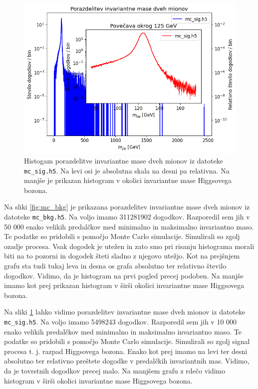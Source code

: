 \documentclass[slovene,11pt,a4paper]{article}
\begin{document}
\begin{figure}[h!]
    \centering
    \includegraphics[width=0.8\linewidth]{imgs/mc_sig.png}
    \caption{Histogam porazdelitve invariantne mase dveh mionov iz datoteke \texttt{mc\_sig.h5}. Na levi osi je absolutna skala na desni pa relativna. Na manjše je prikazan histogram v okolici invariantne mase Higgsovega bozona.}
    \label{fig:mc_sig}
\end{figure}

Na sliki \ref{fig:mc_bkg} je prikazana porazdelitev invariantne mase dveh mionov iz datoteke \texttt{mc\_bkg.h5}. Na voljo imamo 311281902 dogodkov. Razporedil sem jih v 50 000 enako velikih predalčkov med minimalno in maksimalno invariantno maso. Te podatke so pridobili s pomočjo Monte Carlo simulacije. Simulirali so zgolj ozadje procesa. Vsak dogodek je utežen in zato smo pri risanju histograma morali biti na to pozorni in dogodek šteti sladno z njegovo utežjo. Kot na prejšnjem grafu sta tudi tukaj leva in desna os grafa absolutno ter relativno število dogodkov. Vidimo, da je histogram na prvi pogled precej podoben. Na manjše imamo kot prej prikazan histogram v širši okolici invariantne mase Higgsovega bozona.

Na sliki \ref{fig:mc_sig} lahko vidimo porazdelitev invariantne mase dveh mionov iz datoteke \texttt{mc\_sig.h5}. Na voljo imamo 5498243 dogodkov. Razporedil sem jih v 10 000 enako velikih predalčkov med minimalno in maksimalno invariantno maso. Te podatke so pridobili s pomočjo Monte Carlo simulacije. Simulirali so zgolj signal procesa t. j. razpad Higgsovega bozona. Enako kot prej imamo na levi ter desni absolutno ter relativno preštete dogodke v predalčkih invariantnih mas. Vidimo, da je tovrstnih dogodkov precej malo. Na manjšem grafu z rdečo vidimo histogram v širši okolici invariantne mase Higgsovega bozona.
\end{document}
